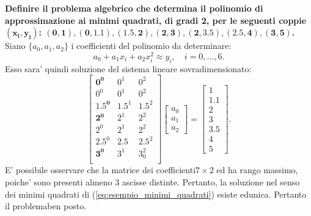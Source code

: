 \begin{example}
	\textbf{Definire il problema algebrico che determina il polinomio di approssimazione ai minimi quadrati, di gradi 2, per le seguenti coppie $\boldsymbol{(x_i, y_i)}$: $\boldsymbol{(0,1), (0, 1.1), (1.5, 2), (2,3), (2, 3.5), (2.5, 4), (3, 5)}$.}\\
	Siano $\{a_0, a_1, a_2\}$ i coefficienti del polinomio da determinare:
	\begin{equation*}
		a_0 + a_1 x_i + a_2 x^2_i \approx y_i,\quad i = 0,\hdots, 6.
	\end{equation*}
	Esso sara' quindi soluzione del sistema lineare sovradimensionato:
	\begin{equation}\label{eq:esempio_minimi_quadrati}
		\begin{bmatrix}
			\boldsymbol{0^0} & 0^1 & 0^2\\
			0^0 & 0^1 & 0^2\\
			\boldsymbol{1.5^0} & 1.5^1 & 1.5^2\\
			\boldsymbol{2^0} & 2^1 & 2^2\\
			2^0& 2^1 & 2^2\\
			\boldsymbol{2.5}^0 & 2.5 & 2.5^2\\
			\boldsymbol{3^0}& 3^1 & 3_0^2\\
		\end{bmatrix}
		\begin{bmatrix}
			a_0\\
			a_1\\
			a_2
		\end{bmatrix} =
		\begin{bmatrix}
			1\\
			1.1\\
			2\\
			3\\
			3.5\\
			4\\
			5
		\end{bmatrix}.
	\end{equation}
	E' possibile osservare che la matrice dei coefficienti$7\times 2$ ed ha rango massimo, poiche' sono presenti almeno 3 ascisse distinte. Pertanto, la soluzione nel senso dei minimi quadrati di (\ref{eq:esempio_minimi_quadrati}) esiste edunica. Pertanto il problema\gls{ben posto}.
\end{example}